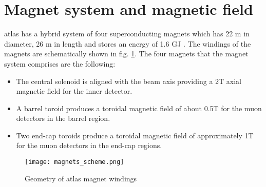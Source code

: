         \section{Magnet system and magnetic field}\label{atlas_magnets}
        \gls{atlas} has a hybrid system of four superconducting magnets which has 22 m in diameter, 26 m in length and stores an energy of 1.6 GJ \cite{magnet_tdr1}. The windings of the magnets are schematically shown in fig. \ref{fig::atlas_magnets}. The four magnets that the magnet system comprises are the following: 
        		\begin{itemize}
        	\item The central solenoid is aligned with the beam axis providing a 2T axial magnetic field for the inner detector.
        	\item A barrel toroid produces a toroidal magnetic field of about 0.5T for the muon detectors in the barrel region.
        	\item Two end-cap toroids produce a toroidal magnetic field of approximately 1T for the muon detectors in the end-cap regions.
        \end{itemize}
        \begin{figure}[htpb]
        	\centering
        	\texttt{[image: magnets\_scheme.png]}
        	\caption{Geometry of \gls{atlas} magnet windings}
        	\label{fig::atlas_magnets}
        \end{figure}
